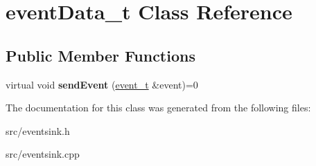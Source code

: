 \hypertarget{classeventData__t}{\section{event\-Data\-\_\-t \-Class \-Reference}
\label{classeventData__t}
}
\subsection*{\-Public \-Member \-Functions}
\begin{DoxyCompactItemize}
\item 
\hypertarget{classeventData__t_a8f898687d6b926e320c02761c0548d1f}{virtual void {\bfseries send\-Event} (\hyperlink{classevent__t}{event\-\_\-t} \&event)=0}\label{classeventData__t_a8f898687d6b926e320c02761c0548d1f}

\end{DoxyCompactItemize}


\-The documentation for this class was generated from the following files\-:\begin{DoxyCompactItemize}
\item 
src/eventsink.\-h\item 
src/eventsink.\-cpp\end{DoxyCompactItemize}
